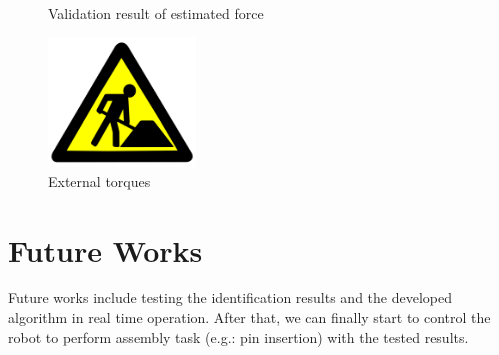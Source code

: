 \documentclass[letterpaper, 10 pt, conference]{ieeeconf}
\begin{document}
\begin{figure}
  \centering
  \,
  \,
  \caption{Validation result of estimated force}
  \label{fig:validation}
\end{figure}

\begin{figure}
  \centering
  \includegraphics[width = 0.35\textwidth ]{placeholder}
  \caption{External torques}
  \label{fig:torque validation}
\end{figure}






      \section{Future Works}
Future works include testing the identification results and the developed algorithm in real time operation. After that, we can finally start to control the robot to perform assembly task (e.g.: pin insertion) with the tested results.
\end{document}
